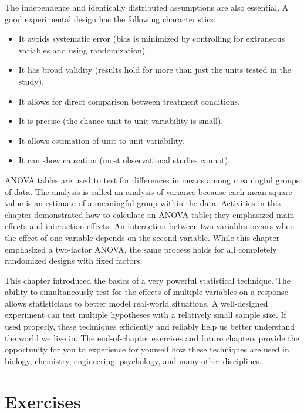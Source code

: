 \documentclass[
]{report}
\begin{document}
The independence and identically distributed assumptions are also essential. A good experimental design has the following characteristics:
\vspace{-1em}

\begin{itemize}
    \item It avoids systematic error (bias is minimized by controlling for extraneous variables and using randomization).
    \item It has broad validity (results hold for more than just the units tested in the study).
    \item It allows for direct comparison between treatment conditions.
    \item It is precise (the chance unit-to-unit variability is small).
    \item It allows estimation of unit-to-unit variability.
    \item It can show causation (most observational studies cannot).
\end{itemize}

ANOVA tables are used to test for differences in means among meaningful groups of data. The analysis is called an analysis of variance because each mean square value is an estimate of a meaningful group within the data. Activities in this chapter demonstrated how to calculate an ANOVA table; they emphasized main effects and interaction effects. An interaction between two variables occurs when the effect of one variable depends on the second variable. While this chapter emphasized a two-factor ANOVA, the same process holds for all completely randomized designs with fixed factors.

This chapter introduced the basics of a very powerful statistical technique. The ability to simultaneously test for the effects of multiple variables on a response allows statisticians to better model real-world situations. A well-designed experiment can test multiple hypotheses with a relatively small sample size. If used properly, these techniques efficiently and reliably help us better understand the world we live in. The end-of-chapter exercises and future chapters provide the opportunity for you to experience for yourself how these techniques are used in biology, chemistry, engineering, psychology, and many other disciplines.

\hypertarget{exercises-3}{%
\section{Exercises}\label{exercises-3}}
\end{document}
